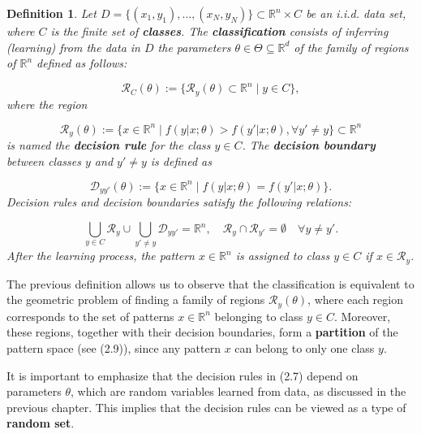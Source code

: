\documentclass{report}
\newtheorem{definition}{Definition}[chapter]
\begin{document}
\begin{definition}
Let $D = \{(x_1,y_1),\dots,(x_N,y_N)\} \subset \mathbb{R}^n \times C$ be an i.i.d. data set, where $C$ is the finite set of \textbf{classes}. The \textbf{classification} consists of inferring (learning) from the data in $D$ the parameters $\theta \in \Theta \subseteq \mathbb{R}^d$ of the family of regions of $\mathbb{R}^n$ defined as follows:

\begin{equation}
\mathcal{R}_C(\theta) := \{\mathcal{R}_y(\theta) \subset \mathbb{R}^n \mid y \in C\},
\end{equation}
where the region

\begin{equation}
\mathcal{R}_y(\theta) := \{x \in \mathbb{R}^n \mid f(y|x;\theta) > f(y'|x;\theta), \forall y' \neq y\} \subset \mathbb{R}^n
\end{equation}
is named the \textbf{decision rule} for the class $y \in C$. The \textbf{decision boundary} between classes $y$ and $y' \neq y$ is defined as

\begin{equation}
\mathcal{D}_{yy'}(\theta) := \{x \in \mathbb{R}^n \mid f(y|x;\theta) = f(y'|x;\theta)\}.
\end{equation}
Decision rules and decision boundaries satisfy the following relations:

\begin{equation}
\bigcup_{y \in C} \mathcal{R}_y \cup \bigcup_{y' \neq y} \mathcal{D}_{yy'} = \mathbb{R}^n, \quad \mathcal{R}_y \cap \mathcal{R}_{y'} = \emptyset \quad \forall y \neq y'.
\end{equation}
After the learning process, the pattern $x \in \mathbb{R}^n$ is assigned to class $y \in C$ if $x \in \mathcal{R}_y$.
\end{definition}
The previous definition allows us to observe that the classification is equivalent to the geometric problem of finding a family of regions $\mathcal{R}_y(\theta)$, where each region corresponds to the set of patterns $x \in \mathbb{R}^n$ belonging to class $y \in C$. Moreover, these regions, together with their decision boundaries, form a \textbf{partition} of the pattern space (see (2.9)), since any pattern $x$ can belong to only one class $y$.

It is important to emphasize that the decision rules in (2.7) depend on parameters $\theta$, which are random variables learned from data, as discussed in the previous chapter. This implies that the decision rules can be viewed as a type of \textbf{random set}.
\end{document}
